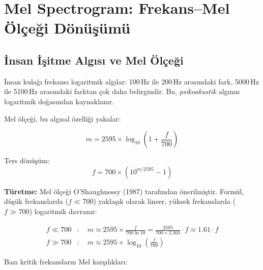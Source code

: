\section{Mel Spectrogram: Frekans--Mel \"{O}l\c{c}e\u{g}i D\"{o}n\"{u}\c{s}\"{u}m\"{u}}
\label{sec:mel_spectrogram}

\subsection{\.{I}nsan \.{I}\c{s}itme Alg{\i}s{\i} ve Mel \"{O}l\c{c}e\u{g}i}

\.{I}nsan kula\u{g}{\i} frekans{\i} logaritmik alg{\i}lar: 100\,Hz ile 200\,Hz aras{\i}ndaki fark, 5000\,Hz ile 5100\,Hz aras{\i}ndaki farktan \c{c}ok daha belirgindir. Bu, \emph{psikoakustik} alg{\i}n{\i}n logaritmik do\u{g}as{\i}ndan kaynaklan{\i}r.

Mel \"{o}l\c{c}e\u{g}i, bu alg{\i}sal \"{o}zelli\u{g}i yakalar:

\begin{formulbox}[Mel \"{O}l\c{c}e\u{g}i D\"{o}n\"{u}\c{s}\"{u}m\"{u}]
\begin{equation}
\label{eq:mel_scale}
m = 2595 \times \log_{10}\!\left(1 + \frac{f}{700}\right)
\end{equation}

Ters d\"{o}n\"{u}\c{s}\"{u}m:
\begin{equation}
\label{eq:mel_inverse}
f = 700 \times \left(10^{m/2595} - 1\right)
\end{equation}
\end{formulbox}

\textbf{T\"{u}retme:} Mel \"{o}l\c{c}e\u{g}i O'Shaughnessy (1987) taraf{\i}ndan \"{o}nerilmi\c{s}tir. Form\"{u}l, d\"{u}\c{s}\"{u}k frekanslarda ($f \ll 700$) yakla\c{s}{\i}k olarak lineer, y\"{u}ksek frekanslarda ($f \gg 700$) logaritmik davran{\i}r:

\begin{align}
f \ll 700 &: \quad m \approx 2595 \times \frac{f}{700 \ln 10} = \frac{2595}{700 \times 2.303} \cdot f \approx 1.61 \cdot f \label{eq:mel_linear} \\
f \gg 700 &: \quad m \approx 2595 \times \log_{10}\!\left(\frac{f}{700}\right) \label{eq:mel_log}
\end{align}

\begin{ornek}
Baz{\i} kritik frekanslar{\i}n Mel kar\c{s}{\i}l{\i}klar{\i}:
\end{ornek}

